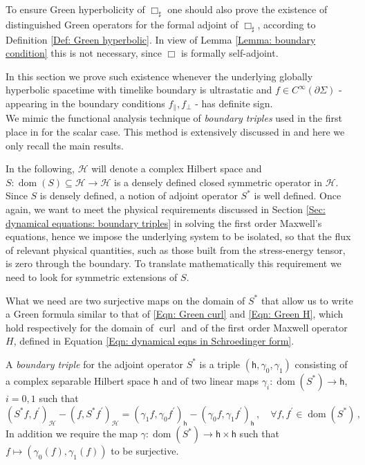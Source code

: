\begin{remark}
	To ensure Green hyperbolicity of $\Box_\sharp$ one should also prove the existence of distinguished Green operators for the formal adjoint of $\Box_\sharp$, according to Definition \ref{Def: Green hyperbolic}. In view of Lemma \ref{Lemma: boundary condition} this is not necessary, since $\Box$ is formally self-adjoint.
\end{remark}

In this section we prove such existence whenever the underlying globally hyperbolic spacetime with timelike boundary is ultrastatic and $f\in C^\infty(\partial \Sigma)$ - appearing in the boundary conditions $f_\parallel,f_\perp$ - has definite sign.\\


We mimic the functional analysis technique of \emph{boundary triples} used in the first place in \cite{Dappiaggi-Drago-Ferreira-19} for the scalar case. This method is extensively discussed in \cite{Behrndt-Langer-12} and here we only recall the main results.

In the following, $\mathcal{H}$ will denote a complex Hilbert space and $S:\operatorname{dom}(S)\subseteq\mathcal{H}\to\mathcal{H}$ is a densely defined closed symmetric operator in $\mathcal{H}$. Since $S$ is densely defined, a notion of adjoint operator $S^*$ is well defined.
Once again, we want to meet the physical requirements discussed in Section \ref{Sec: dynamical equations: boundary triples} in solving the first order Maxwell's equations, hence we impose the underlying system to be isolated, so that the flux of relevant physical quantities, such as those built from the stress-energy tensor, is zero through the boundary. To translate mathematically this requirement we need to look for symmetric extensions of $S$.


What we need are two surjective maps on the domain of $S^*$ that allow us to write a Green formula similar to that of \eqref{Eqn: Green curl} and \eqref{Eqn: Green H}, which hold respectively for the domain of $\operatorname{curl}$ and of the first order Maxwell operator $H$, defined in Equation \eqref{Eqn: dynamical eqns in Schroedinger form}.


\begin{Definition}\label{Def: boundary triples}
	A \emph{boundary triple} for the adjoint operator $S^*$ is a triple $(\mathsf{h},\gamma_0,\gamma_1)$ consisting of a complex separable Hilbert space $\mathsf{h}$ and of two linear maps $\gamma_i:\operatorname{dom}(S^*)\to\mathsf{h}$, $i=0,1$ such that 
	$$(S^*f,f^\prime)_{\mathcal{H}}-(f,S^*f^\prime)_{\mathcal{H}}=(\gamma_1 f,\gamma_0 f^\prime)_{\mathsf{h}}-(\gamma_0 f,\gamma_1 f^\prime)_{\mathsf{h}}\,,
	\quad\forall f,f^\prime\in \operatorname{dom}(S^*)\,,$$
	In addition we require the map $\gamma:\operatorname{dom}(S^*)\to\mathsf{h}\times\mathsf{h}$ such that $f\mapsto (\gamma_0(f),\gamma_1(f))$ to be surjective.
\end{Definition}


